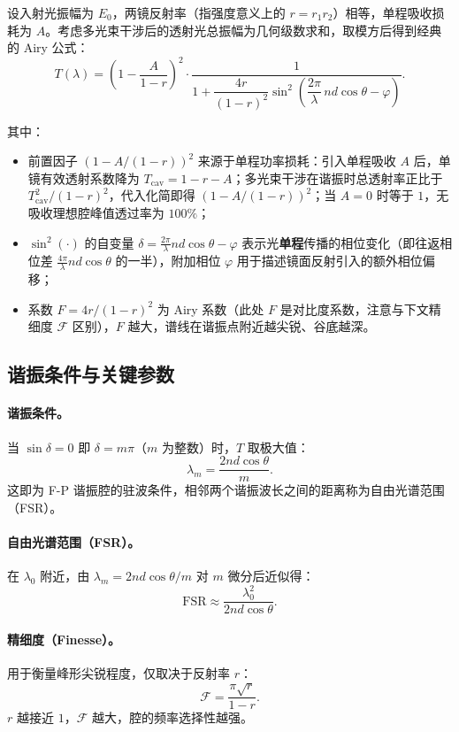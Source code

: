 \documentclass[10.5pt]{config}
\begin{document}
设入射光振幅为 $E_0$，两镜反射率（指强度意义上的 $r = r_1 r_2$）相等，单程吸收损耗为 $A$。考虑多光束干涉后的透射光总振幅为几何级数求和，取模方后得到经典的 Airy 公式：
$$T(\lambda) = \left(1 - \frac{A}{1-r}\right)^{2} \cdot \frac{1}{1 + \dfrac{4r}{(1-r)^{2}}\sin^{2}\!\left(\dfrac{2\pi}{\lambda}\,nd\cos\theta - \varphi\right)}.$$

其中：
\begin{itemize}
    \item 前置因子 $\left(1 - A/(1-r)\right)^2$ 来源于单程功率损耗：引入单程吸收 $A$ 后，单镜有效透射系数降为 $T_{\text{cav}}=1-r-A$；多光束干涉在谐振时总透射率正比于 $T_{\text{cav}}^2/(1-r)^2$，代入化简即得 $(1-A/(1-r))^2$；当 $A=0$ 时等于 $1$，无吸收理想腔峰值透过率为 $100\%$；
    \item $\sin^{2}(\cdot)$ 的自变量 $\delta = \frac{2\pi}{\lambda}nd\cos\theta - \varphi$ 表示光\textbf{单程}传播的相位变化（即往返相位差 $\frac{4\pi}{\lambda}nd\cos\theta$ 的一半），附加相位 $\varphi$ 用于描述镜面反射引入的额外相位偏移；
    \item 系数 $F = 4r/(1-r)^2$ 为 Airy 系数（此处 $F$ 是对比度系数，注意与下文精细度 $\mathcal{F}$ 区别），$F$ 越大，谱线在谐振点附近越尖锐、谷底越深。
\end{itemize}

\subsection{谐振条件与关键参数}

\paragraph{谐振条件。} 当 $\sin\delta = 0$ 即 $\delta = m\pi$（$m$ 为整数）时，$T$ 取极大值：
$$\lambda_m = \frac{2nd\cos\theta}{m}.$$
这即为 F-P 谐振腔的驻波条件，相邻两个谐振波长之间的距离称为自由光谱范围（FSR）。

\paragraph{自由光谱范围（FSR）。} 在 $\lambda_0$ 附近，由 $\lambda_m = 2nd\cos\theta/m$ 对 $m$ 微分后近似得：
$$\mathrm{FSR} \approx \frac{\lambda_0^{2}}{2nd\cos\theta}.$$

\paragraph{精细度（Finesse）。} 用于衡量峰形尖锐程度，仅取决于反射率 $r$：
$$\mathcal{F} = \frac{\pi\sqrt{r}}{1-r}.$$
$r$ 越接近 $1$，$\mathcal{F}$ 越大，腔的频率选择性越强。
\end{document}
